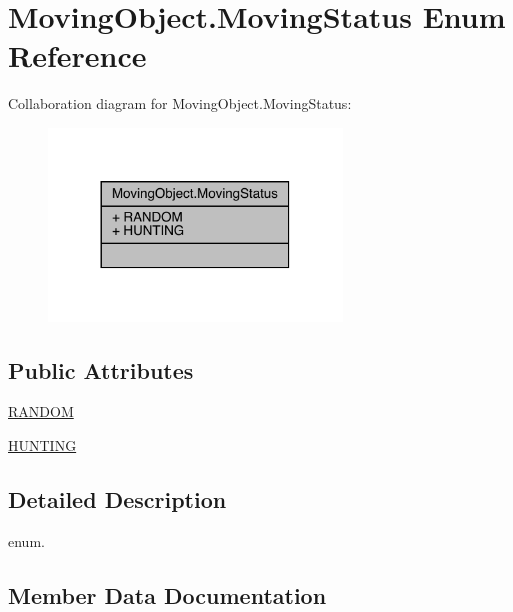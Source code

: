 \hypertarget{enum_moving_object_1_1_moving_status}{}\section{Moving\+Object.\+Moving\+Status Enum Reference}
\label{enum_moving_object_1_1_moving_status}


Collaboration diagram for Moving\+Object.\+Moving\+Status\+:
\nopagebreak
\begin{figure}[H]
\begin{center}
\leavevmode
\includegraphics[width=221pt]{enum_moving_object_1_1_moving_status__coll__graph}
\end{center}
\end{figure}
\subsection*{Public Attributes}
\begin{DoxyCompactItemize}
\item 
\mbox{\hyperlink{enum_moving_object_1_1_moving_status_ab46cd9780091a74038f2bba2e15998d7}{R\+A\+N\+D\+OM}}
\item 
\mbox{\hyperlink{enum_moving_object_1_1_moving_status_ad37d0a6b5268276a61c3a4373829f96c}{H\+U\+N\+T\+I\+NG}}
\end{DoxyCompactItemize}


\subsection{Detailed Description}
enum. 

\subsection{Member Data Documentation}
\mbox{\label{enum_moving_object_1_1_moving_status_ad37d0a6b5268276a61c3a4373829f96c}} 
